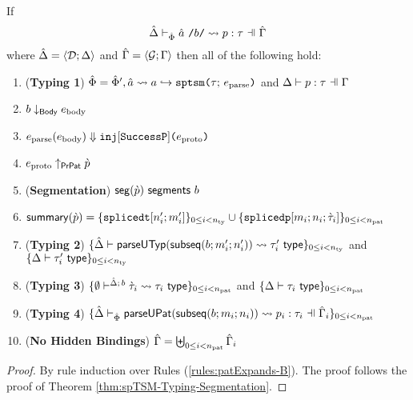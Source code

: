\begin{theorem}
\label{thm:spTSM-Typing-Segmentation-B}
If \[\patExpands{\upctx}{\uPhi}{\utsmap{\tsmv}{b}}{p}{\tau}\] where $\hat{\Delta}=\langle \mathcal{D}; \Delta \rangle$ and $\hat{\Gamma}=\langle \mathcal{G}; \Gamma \rangle$ then all of the following hold:
\begin{enumerate}
        \item (\textbf{Typing 1}) $\hat\Phi=\hat\Phi', \hat{a} \leadsto a \hookrightarrow \texttt{sptsm}\texttt{(}\tau;\,e_\text{parse}\texttt{)}$ and $\patType{\pctx}{p}{\tau}$
        \item $b \downarrow_\mathsf{Body} e_\text{body}$
        \item $e_\text{parse}(e_\text{body}) \Downarrow \texttt{inj}[\mathtt{SuccessP}]\texttt{(}e_\text{proto}\texttt{)}$
        \item $e_\text{proto} \uparrow_\mathsf{PrPat} \grave{p}$
        \item (\textbf{Segmentation}) $\mathsf{seg}(\grave{p})~\mathsf{segments}~b$
        \item $\mathsf{summary}(\grave{p}) = \{\texttt{splicedt}[n'_i; m'_i]\}_{0 \leq i < n_\text{ty}} \cup \{\texttt{splicedp}[m_i; n_i; \grave{\tau}_i]\}_{0 \leq i < n_\text{pat}}$
        \item (\textbf{Typing 2}) $\{
              \hat{\Delta} \vdash 
                \mathsf{parseUTyp}(\mathsf{subseq}(b; m'_i; n'_i))
               \leadsto \tau'_i~\mathsf{type}
            \}_{0 \leq i < n_\text{ty}}$ and $\{\Delta \vdash \tau'_i~\mathsf{type}\}_{0 \leq i < n_\text{ty}}$
        \item (\textbf{Typing 3}) $\{
          \emptyset\vdash^{
            \hat{\Delta};\,b
          } 
            \grave{\tau}_i
           \leadsto \tau_i~\mathsf{type}
        \}_{0 \leq i < n_\text{pat}}$ and $\{\Delta \vdash \tau_i~\mathsf{type}\}_{0 \leq i < n_\text{pat}}$
        \item (\textbf{Typing 4}) $\sseq{
          \patExpands
            {\upctx_i}
            {\uPhi}
            {\parseUPatF{\bsubseq{b}{m_i}{n_i}}}
            {p_i}
            {\tau_i}
        }{\npat}$ 
      \item (\textbf{No Hidden Bindings}) $\hat\Gamma = \biguplus_{0 \leq i < n_\text{pat}} \hat\Gamma_i$
\end{enumerate}
\end{theorem}
\begin{proof} By rule induction over Rules (\ref{rules:patExpands-B}). The proof follows the proof of Theorem \ref{thm:spTSM-Typing-Segmentation}.
\end{proof}

